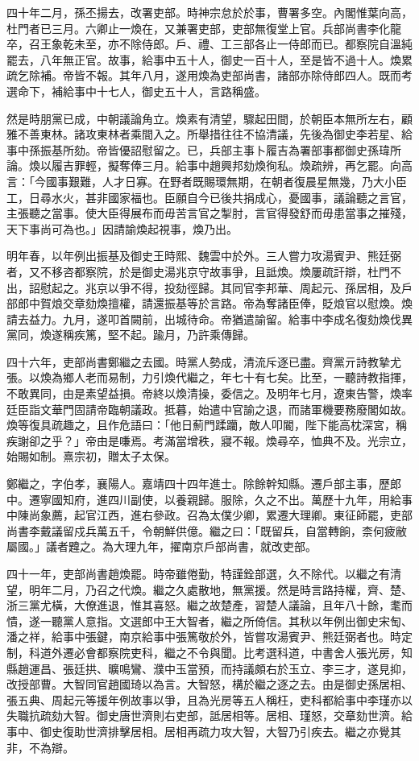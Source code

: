 \begin{pinyinscope}
四十年二月，孫丕揚去，改署吏部。時神宗怠於於事，曹署多空。內閣惟葉向高，杜門者已三月。六卿止一煥在，又兼署吏部，吏部無復堂上官。兵部尚書李化龍卒，召王象乾未至，亦不除侍郎。戶、禮、工三部各止一侍郎而已。都察院自溫純罷去，八年無正官。故事，給事中五十人，御史一百十人，至是皆不過十人。煥累疏乞除補。帝皆不報。其年八月，遂用煥為吏部尚書，諸部亦除侍郎四人。既而考選命下，補給事中十七人，御史五十人，言路稱盛。

然是時朋黨已成，中朝議論角立。煥素有清望，驟起田間，於朝臣本無所左右，顧雅不善東林。諸攻東林者乘間入之。所舉措往往不協清議，先後為御史李若星、給事中孫振基所劾。帝皆優詔慰留之。已，兵部主事卜履吉為署部事都御史孫瑋所論。煥以履吉罪輕，擬奪俸三月。給事中趙興邦劾煥徇私。煥疏辨，再乞罷。向高言：「今國事艱難，人才日寡。在野者既賜環無期，在朝者復晨星無幾，乃大小臣工，日尋水火，甚非國家福也。臣願自今已後共捐成心，憂國事，議論聽之言官，主張聽之當事。使大臣得展布而毋苦言官之掣肘，言官得發舒而毋患當事之摧殘，天下事尚可為也。」因請諭煥起視事，煥乃出。

明年春，以年例出振基及御史王時熙、魏雲中於外。三人嘗力攻湯賓尹、熊廷弼者，又不移咨都察院，於是御史湯兆京守故事爭，且詆煥。煥屢疏訐辯，杜門不出，詔慰起之。兆京以爭不得，投劾徑歸。其同官李邦華、周起元、孫居相，及戶部郎中賀烺交章劾煥擅權，請還振基等於言路。帝為奪諸臣俸，貶烺官以慰煥。煥請去益力。九月，遂叩首闕前，出城待命。帝猶遣諭留。給事中李成名復劾煥伐異黨同，煥遂稱疾篤，堅不起。踰月，乃許乘傳歸。

四十六年，吏部尚書鄭繼之去國。時黨人勢成，清流斥逐已盡。齊黨亓詩教摯尤張。以煥為鄉人老而易制，力引煥代繼之，年七十有七矣。比至，一聽詩教指揮，不敢異同，由是素望益損。帝終以煥清操，委信之。及明年七月，遼東告警，煥率廷臣詣文華門固請帝臨朝議政。抵暮，始遣中官諭之退，而諸軍機要務廢閣如故。煥等復具疏趣之，且作危語曰：「他日薊門蹂躪，敵人叩閽，陛下能高枕深宮，稱疾謝卻之乎？」帝由是嗛焉。考滿當增秩，寢不報。煥尋卒，恤典不及。光宗立，始賜如制。熹宗初，贈太子太保。

鄭繼之，字伯孝，襄陽人。嘉靖四十四年進士。除餘幹知縣。遷戶部主事，歷郎中。遷寧國知府，進四川副使，以養親歸。服除，久之不出。萬歷十九年，用給事中陳尚象薦，起官江西，進右參政。召為太僕少卿，累遷大理卿。東征師罷，吏部尚書李戴議留戍兵萬五千，令朝鮮供億。繼之曰：「既留兵，自當轉餉，柰何疲敝屬國。」議者韙之。為大理九年，擢南京戶部尚書，就改吏部。

四十一年，吏部尚書趙煥罷。時帝雖倦勤，特謹銓部選，久不除代。以繼之有清望，明年二月，乃召之代煥。繼之久處散地，無黨援。然是時言路持權，齊、楚、浙三黨尤橫，大僚進退，惟其喜怒。繼之故楚產，習楚人議論，且年八十餘，耄而憒，遂一聽黨人意指。文選郎中王大智者，繼之所倚信。其秋以年例出御史宋匋、潘之祥，給事中張鍵，南京給事中張篤敬於外，皆嘗攻湯賓尹、熊廷弼者也。時定制，科道外遷必會都察院吏科，繼之不令與聞。比考選科道，中書舍人張光房，知縣趙運昌、張廷拱、曠鳴鸞、濮中玉當預，而持議頗右於玉立、李三才，遂見抑，改授部曹。大智同官趙國琦以為言。大智怒，構於繼之逐之去。由是御史孫居相、張五典、周起元等援年例故事以爭，且為光房等五人稱枉，吏科都給事中李瑾亦以失職抗疏劾大智。御史唐世濟則右吏部，詆居相等。居相、瑾怒，交章劾世濟。給事中、御史復助世濟排擊居相。居相再疏力攻大智，大智乃引疾去。繼之亦覺其非，不為辯。


\end{pinyinscope}
